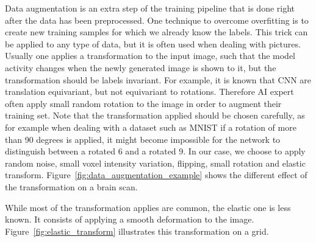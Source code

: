Data augmentation is an extra step of the training pipeline that is done right after the data has been preprocessed. One technique to overcome overfitting is to create new training samples for which we already know the labels. This trick can be applied to any type of data, but it is often used when dealing with pictures. Usually one applies a transformation to the input image, such that the model activity changes when the newly generated image is shown to it, but the transformation should be labels invariant. 
For example, it is known that CNN are translation equivariant, but not equivariant to rotations. Therefore AI expert often apply small random rotation to the image in order to augment their training set. Note that the transformation applied should be chosen carefully, as for example when dealing with a dataset such as MNIST if a rotation of more than 90 degrees is applied, it might become impossible for the network to distinguish between a rotated $6$ and a rotated $9$. 
In our case, we choose to apply random noise, small voxel intensity variation, flipping, small rotation and elastic transform. Figure~\ref{fig:data_augmentation_example} shows the different effect of the transformation on a brain scan.

While most of the transformation applies are common, the elastic one is less known. It consists of applying a smooth deformation to the image. Figure~\ref{fig:elastic_transform} illustrates this transformation on a grid.


